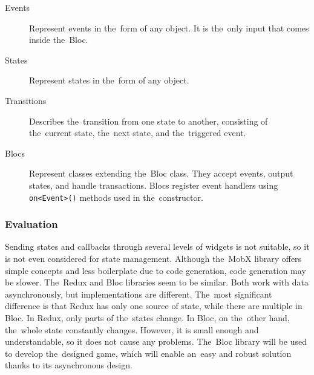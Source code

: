 \begin{description}
    \item[Events] Represent events in the~form of any object.
    It is the~only input that comes inside the~Bloc.
    \item[States] Represent states in the~form of any object.
    \item[Transitions] Describes the~transition from one state to another, consisting of the~current state, the~next state, and the~triggered event.
    \item[Blocs] Represent classes extending the~Bloc class.
    They accept events, output states, and handle transactions.
    Blocs register event handlers using \texttt{on<Event>()} methods used in the~constructor.
\end{description}

\subsubsection{Evaluation}

Sending states and callbacks through several levels of widgets is not suitable, so it is not even considered for state management.
Although the~MobX library offers simple concepts and less boilerplate due to code generation, code generation may be slower.
The~Redux and Bloc libraries seem to be similar.
Both work with data asynchronously, but implementations are different.
The~most significant difference is that Redux has only one source of state, while there are multiple in Bloc.
In Redux, only parts of the~states change.
In Bloc, on the~other hand, the~whole state constantly changes.
However, it is small enough and understandable, so it does not cause any problems.
The~Bloc library will be used to develop the~designed game, which will enable an~easy and robust solution thanks to its asynchronous design.
